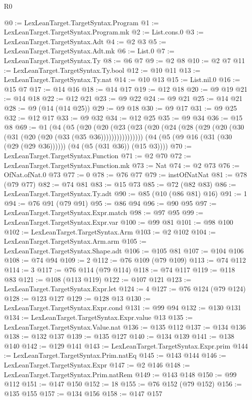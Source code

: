 \begin{lexlean}{R0}
\begin{coremodule}
@0 := LexLeanTarget.TargetSyntax.Program
@1 := LexLeanTarget.TargetSyntax.Program.mk
@2 := List.cons.{0}
@3 := LexLeanTarget.TargetSyntax.Adt
@4 := @2 @3
@5 := LexLeanTarget.TargetSyntax.Adt.mk
@6 := List.{0}
@7 := LexLeanTarget.TargetSyntax.Ty
@8 := @6 @7
@9 := @2 @8
@10 := @2 @7
@11 := LexLeanTarget.TargetSyntax.Ty.bool
@12 := @10 @11
@13 := LexLeanTarget.TargetSyntax.Ty.nat
@14 := @10 @13
@15 := List.nil.{0}
@16 := @15 @7
@17 := @14 @16
@18 := @14 @17
@19 := @12 @18
@20 := @9 @19
@21 := @14 @18
@22 := @12 @21
@23 := @9 @22
@24 := @9 @21
@25 := @14 @21
@28 := @9 (@14 (@14 @25))
@29 := @9 @18
@30 := @9 @17
@31 := @9 @25
@32 := @12 @17
@33 := @9 @32
@34 := @12 @25
@35 := @9 @34
@36 := @15 @8
@69 := @1
    (@4
      (@5
        (@20
          (@20 (@23 (@23 (@20 (@24 (@28 (@29 (@20 (@30 (@31 (@20 (@20 (@33 (@35 @36))))))))))))))))
      (@4 (@5 (@9 @16 (@31 (@30 (@29 (@29 @36)))))) (@4 (@5 (@31 @36)) (@15 @3))))
@70 := LexLeanTarget.TargetSyntax.Function
@71 := @2 @70
@72 := LexLeanTarget.TargetSyntax.Function.mk
@73 := Nat
@74 := @2 @73
@76 := OfNat.ofNat.{0} @73
@77 := 0
@78 := @76 @77
@79 := instOfNatNat
@81 := @78 (@79 @77)
@82 := @74 @81
@83 := @15 @73
@85 := @72 (@82 @83)
@86 := LexLeanTarget.TargetSyntax.Ty.adt
@90 := @85 (@10 (@86 @81) @16)
@91 := 1
@94 := @76 @91 (@79 @91)
@95 := @86 @94
@96 := @90 @95
@97 := LexLeanTarget.TargetSyntax.Expr.match
@98 := @97 @95
@99 := LexLeanTarget.TargetSyntax.Expr.var
@100 := @99 @81
@101 := @98 @100
@102 := LexLeanTarget.TargetSyntax.Arm
@103 := @2 @102
@104 := LexLeanTarget.TargetSyntax.Arm.arm
@105 := LexLeanTarget.TargetSyntax.Shape.adt
@106 := @105 @81
@107 := @104 @106
@108 := @74 @94
@109 := 2
@112 := @76 @109 (@79 @109)
@113 := @74 @112
@114 := 3
@117 := @76 @114 (@79 @114)
@118 := @74 @117
@119 := @118 @83
@121 := @108 (@113 @119)
@122 := @107 @121
@123 := LexLeanTarget.TargetSyntax.Expr.let
@124 := 4
@127 := @76 @124 (@79 @124)
@128 := @123 @127
@129 := @128 @13
@130 := LexLeanTarget.TargetSyntax.Expr.cond
@131 := @99 @94
@132 := @130 @131
@134 := LexLeanTarget.TargetSyntax.Expr.value @13
@135 := LexLeanTarget.TargetSyntax.Value.nat
@136 := @135 @112
@137 := @134 @136
@138 := @132 @137
@139 := @135 @127
@140 := @134 @139
@141 := @138 @140
@142 := @129 @141
@143 := LexLeanTarget.TargetSyntax.Expr.prim
@144 := LexLeanTarget.TargetSyntax.Prim.natEq
@145 := @143 @144
@146 := LexLeanTarget.TargetSyntax.Expr
@147 := @2 @146
@148 := LexLeanTarget.TargetSyntax.Prim.natRem
@149 := @143 @148
@150 := @99 @112
@151 := @147 @150
@152 := 18
@155 := @76 @152 (@79 @152)
@156 := @135 @155
@157 := @134 @156
@158 := @147 @157

\end{coremodule}
\end{lexlean}
